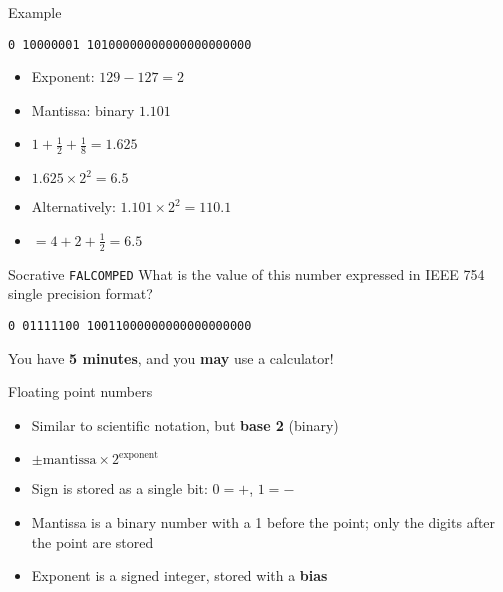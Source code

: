 
\begin{frame}{Example}
	\pause
	\begin{center}
		\texttt{0 10000001 10100000000000000000000}
	\end{center}
	\begin{itemize}
		\pause\item Exponent: $129 - 127 = 2$
		\pause\item Mantissa: binary $1.101$
		\pause\item $1 + \frac12 + \frac18 = 1.625$
		\pause\item $1.625 \times 2^2 = 6.5$
		\pause\item Alternatively: $1.101 \times 2^2 = 110.1$
		\pause\item $= 4 + 2 + \frac12 = 6.5$
	\end{itemize}
\end{frame}

\begin{frame}{Socrative \texttt{FALCOMPED}}
	\pause
	What is the value of this number expressed in IEEE 754 single precision format?
	\begin{center}
		\texttt{0 01111100 10011000000000000000000}
	\end{center}
	You have \textbf{5 minutes}, and you \textbf{may} use a calculator!
\end{frame}

\begin{frame}{Floating point numbers}
	\begin{itemize}
		\pause\item Similar to scientific notation, but \textbf{base 2} (binary)
		\pause\item $\pm \text{mantissa} \times 2^{\text{exponent}}$
		\pause\item Sign is stored as a single bit: $0=+$, $1=-$
		\pause\item Mantissa is a binary number with a 1 before the point;
			only the digits after the point are stored
		\pause\item Exponent is a signed integer, stored with a \textbf{bias}
	\end{itemize}
\end{frame}

